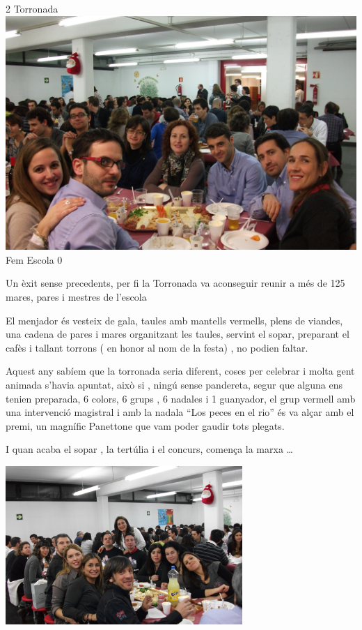 \begin{news}
{2} %
{Torronada}
{ \noindent\includegraphics[width=18.2cm,keepaspectratio]{ampa/img/DSCF0909.JPG}}
{Fem Escola}
{0} %


Un èxit sense precedents, per fi la Torronada va aconseguir reunir a més de 125 mares, pares i mestres de l’escola

El menjador és vesteix de gala, taules amb mantells vermells, plens de viandes, una cadena de pares i mares organitzant les taules, servint el sopar, preparant el cafès i tallant torrons ( en honor al nom de la festa) , no podien faltar.

Aquest any sabíem que la torronada seria diferent, coses per celebrar i molta gent animada s’havia apuntat, això si , ningú sense pandereta, segur que alguna ens tenien preparada, 
6 colors, 6 grups , 6 nadales i 1 guanyador, el grup vermell amb una intervenció magistral i amb la nadala “Los peces en el rio” és va alçar amb el premi, un magnífic Panettone que vam poder gaudir  tots plegats.

I quan acaba el sopar , la tertúlia i el concurs,  comença la marxa … 



\noindent\includegraphics[width=9cm,keepaspectratio]{ampa/img/DSCF0911.JPG}


\end{news}
